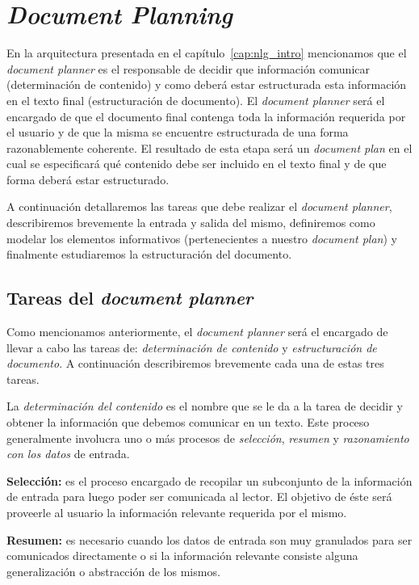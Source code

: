 \chapter{\textit{Document Planning}}
\label{cap:document_planning}

En la arquitectura presentada en el capítulo~\ref{cap:nlg_intro} mencionamos que el \emph{document planner} es el responsable de decidir que información comunicar (determinación de contenido) y como deberá estar estructurada esta información en el texto final (estructuración de documento). El \textit{document planner} será el encargado de que el documento final contenga toda la información requerida por el usuario y de que la misma se encuentre estructurada de una forma razonablemente coherente. El resultado de esta etapa será un \emph{document plan} en el cual se especificará qué contenido debe ser incluido en el texto final y de que forma deberá estar estructurado.


A continuación detallaremos las tareas que debe realizar el \textit{document planner}, describiremos brevemente la entrada y salida del mismo, definiremos como modelar los elementos informativos (pertenecientes a nuestro \emph{document plan}) y finalmente estudiaremos la estructuración del documento.

\section{Tareas del \textit{document planner}}
Como mencionamos anteriormente, el \textit{document planner} será el encargado de llevar a cabo las tareas de: \emph{determinación de contenido} y \emph{estructuración de documento}. A continuación describiremos brevemente cada una de estas tres tareas.

La \emph{determinación del contenido} es el nombre que se le da a la tarea de decidir y obtener la información que debemos comunicar en un texto. Este proceso generalmente involucra uno o más procesos de \emph{selección}, \emph{resumen} y \emph{razonamiento con los datos} de entrada.

\bigskip
\noindent
\textbf{Selección:} es el proceso encargado de recopilar un subconjunto de la información de entrada para luego poder ser comunicada al lector. El objetivo de éste será proveerle al usuario la información relevante requerida por el mismo.

\bigskip
\noindent
\textbf{Resumen:} es necesario cuando los datos de entrada son muy granulados para ser comunicados directamente o si la información relevante consiste alguna generalización o abstracción de los mismos.

